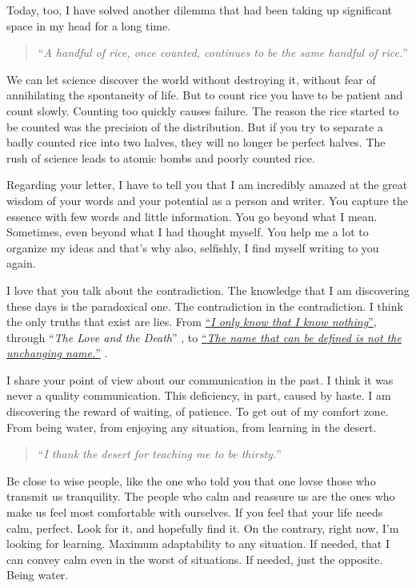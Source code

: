 \documentclass[]{book}
\begin{document}
Today, too, I have solved another dilemma that had been taking up significant space in my head for a long time.

\begin{quote}
``\emph{A handful of rice, once counted, continues to be the same handful of rice.}''
\end{quote}

We can let science discover the world without destroying it, without fear of annihilating the spontaneity of life. But to count rice you have to be patient and count slowly. Counting too quickly causes failure. The reason the rice started to be counted was the precision of the distribution. But if you try to separate a badly counted rice into two halves, they will no longer be perfect halves. The rush of science leads to atomic bombs and poorly counted rice.

Regarding your letter, I have to tell you that I am incredibly amazed at the great wisdom of your words and your potential as a person and writer. You capture the essence with few words and little information. You go beyond what I mean. Sometimes, even beyond what I had thought myself. You help me a lot to organize my ideas and that's why also, selfishly, I find myself writing to you again.

I love that you talk about the contradiction. The knowledge that I am discovering these days is the paradoxical one. The contradiction in the contradiction. I think the only truths that exist are lies. From \href{https://en.wikipedia.org/wiki/I_know_that_I_know_nothing}{``\emph{I only know that I know nothing}''}, through ``\emph{The Love and the Death}'' \citep{val2011orfeo}, to \href{https://en.wikipedia.org/wiki/Tao_Te_Ching}{``\emph{The name that can be defined is not the unchanging name.}''} \citep{ta1984tao}.

I share your point of view about our communication in the past. I think it was never a quality communication. This deficiency, in part, caused by haste. I am discovering the reward of waiting, of patience. To get out of my comfort zone. From being water, from enjoying any situation, from learning in the desert.

\begin{quote}
``\emph{I thank the desert for teaching me to be thirsty.}''
\end{quote}

Be close to wise people, like the one who told you that one lovse those who transmit us tranquility. The people who calm and reassure us are the ones who make us feel most comfortable with ourselves. If you feel that your life needs calm, perfect. Look for it, and hopefully find it. On the contrary, right now, I'm looking for learning. Maximum adaptability to any situation. If needed, that I can convey calm even in the worst of situations. If needed, just the opposite. Being water.
\end{document}
